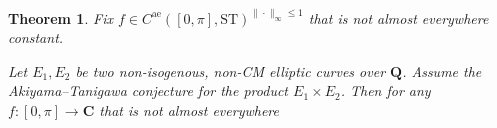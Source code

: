\documentclass{article}
\newcommand{\bC}{\mathbf{C}}
\newcommand{\bQ}{\mathbf{Q}}
\newcommand{\alev}{\mathrm{ae}}
\newcommand{\ST}{\mathrm{ST}}
\newtheorem{theorem}[subsection]{Theorem}
\theoremstyle{definition}
\begin{document}
\begin{theorem}
Fix $f\in C^\alev([0,\pi],\ST)^{\|\cdot\|_\infty\leqslant 1}$ that is not 
almost everywhere constant. 

Let $E_1,E_2$ be two non-isogenous, non-CM elliptic curves over $\bQ$. 
Assume the Akiyama--Tanigawa conjecture for the product $E_1\times E_2$. 
Then for any $f\colon [0,\pi]\to \bC$ that is not almost everywhere 
\end{theorem}





\printbibliography
\end{document}
